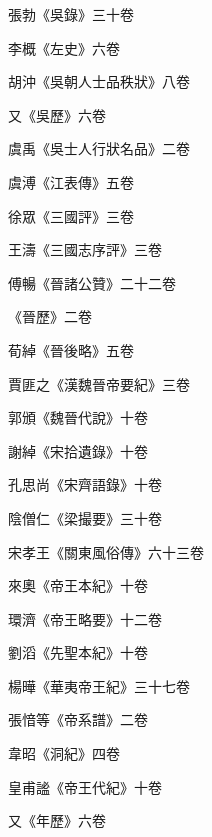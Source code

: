\begin{pinyinscope}
 張勃《吳錄》三十卷



 李概《左史》六卷



 胡沖《吳朝人士品秩狀》八卷



 又《吳歷》六卷



 虞禹《吳士人行狀名品》二卷



 虞溥《江表傳》五卷



 徐眾《三國評》三卷



 王濤《三國志序評》三卷



 傅暢《晉諸公贊》二十二卷



 《晉歷》二卷



 荀綽《晉後略》五卷



 賈匪之《漢魏晉帝要紀》三卷



 郭頒《魏晉代說》十卷



 謝綽《宋拾遺錄》十卷



 孔思尚《宋齊語錄》十卷



 陰僧仁《梁撮要》三十卷



 宋孝王《關東風俗傳》六十三卷



 來奧《帝王本紀》十卷



 環濟《帝王略要》十二卷



 劉滔《先聖本紀》十卷



 楊曄《華夷帝王紀》三十七卷



 張愔等《帝系譜》二卷



 韋昭《洞紀》四卷



 皇甫謐《帝王代紀》十卷



 又《年歷》六卷




\end{pinyinscope}
